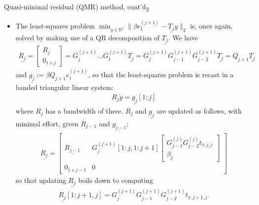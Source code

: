\documentclass[t,usepdftitle=false]{beamer}
\begin{document}
\begin{frame}{Quasi-minimal residual (QMR) method, cont'd\textsubscript{2}}
\begin{itemize}
\item The least-squares problem $\min_{y\in\mathbb{R}^j}\|\beta e_1^{(j+1)}-\underline{T_j}y\|_2$ is, once again, solved by making use of a QR decomposition of $\underline{T_j}$. We have\vspace{-.1cm}
\begin{align*}
\underline{R_j}=
\begin{bmatrix}R_j\\0_{1\times j}\end{bmatrix}=
G^{(j+1)}_j\dots G_1^{(j+1)}\underline{T_j}=
G^{(j+1)}_jG^{(j+1)}_{j-1}G_{j-2}^{(j+1)}\underline{T_j}=
Q_{j+1}\underline{T_j}
\end{align*}
and $\underline{g_j}:=\beta Q_{j+1}e_1^{(j+1)}$, so that the least-squares problem is recast in a banded triangular linear system:\vspace{-.1cm}
\begin{align*}
R_j\tilde{y}=\underline{g_j}[1:j]
\end{align*}
where $R_j$ has a bandwidth of three.
$R_j$ and $\underline{g_j}$ are updated as follows, with minimal effort, given $R_{j-1}$ and $\underline{g_{j-1}}$:\vspace{-.1cm}
\begin{align*}
\underline{R_j}=
\begin{bmatrix}
\underline{R_{j-1}}&G_j^{(j+1)}[1:j,1:j+1]\begin{bmatrix}G_{j-1}^{(j)}G_{j-2}^{(j)}t_{1:j,j}\\\beta_j\end{bmatrix}\\
0_{1\times{j-1}}&0
\end{bmatrix}
\end{align*}
so that updating $\underline{R_j}$ boils down to computing\vspace{-.1cm}
\begin{align*}
\underline{R_j}[1:j+1,j]=G_{j}^{(j+1)}G_{j-1}^{(j+1)}G_{j-2}^{(j+1)}t_{1:j+1,j}.
\end{align*}
\end{itemize}
\end{frame}
\end{document}
